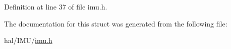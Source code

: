 Definition at line 37 of file imu.\+h.



The documentation for this struct was generated from the following file\+:\begin{DoxyCompactItemize}
\item 
hal/\+I\+M\+U/\hyperlink{imu_8h}{imu.\+h}\end{DoxyCompactItemize}
